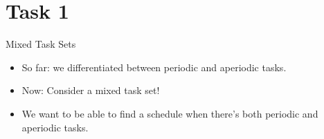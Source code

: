 
\section{Task 1}

\setcounter{task}{1}

\begin{frame}{Mixed Task Sets}{}
    \begin{itemize}
        \item So far: we differentiated between \alert{periodic} and \alert{aperiodic} tasks.
        \item Now: Consider a \alert{mixed} task set!
        \item We want to be able to find a schedule when there's both \alert{periodic} and \alert{aperiodic} tasks.
    \end{itemize}
\end{frame}

